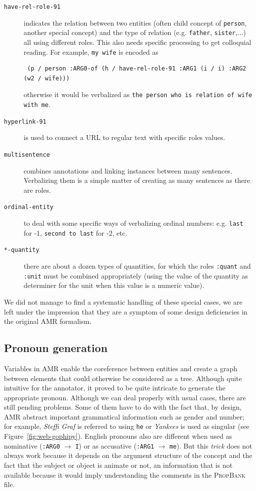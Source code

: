 \documentclass[12pt]{article}
\newcommand{\systeme}[1]{\textsc{#1}}
\newcommand{\propbank}{\systeme{PropBank}}
\newcommand{\representation}[1]{\textsf{#1}}
\newcommand{\AMR}{\representation{AMR}}
\begin{document}
\begin{description}
 \item[\texttt{have-rel-role-91}] indicates the relation between two entities (often child concept of \texttt{person}, another special concept) and the type of relation (e.g. \texttt{father}, \texttt{sister},...) all using different roles.  This also needs specific processing to get colloquial reading. For example, \lstinline{my wife} is encoded as
 \begin{lstlisting}
 (p / person :ARG0-of (h / have-rel-role-91 :ARG1 (i / i) :ARG2 (w2 / wife)))
 \end{lstlisting}
 otherwise it would be verbalized as \texttt{the person who is relation of wife with me}.
 \item[\texttt{hyperlink-91}] is used to connect a URL to regular text with specific roles values.
 \item[\texttt{multisentence}] combines annotations and linking instances between many sentences. Verbalizing them is a simple matter of creating as many sentences as there are roles.
 \item[\texttt{ordinal-entity}] to deal with some specific ways of verbalizing ordinal numbers: e.g. \texttt{last} for -1, \texttt{second to last} for -2, etc.
 \item[\texttt{*-quantity}] there are about a dozen types of quantities, for which the roles \texttt{:quant} and \texttt{:unit} must be combined appropriately (using the value of the quantity as determiner for the unit when this value is a numeric value).
\end{description}

We did not manage to find a systematic handling of these special cases, we are left under the impression that they are a symptom of some design deficiencies in the original \AMR{} formalism.

\subsection{Pronoun generation} %
\label{ssub:pronoun_generation}
Variables in \AMR{} enable the coreference between entities and create a graph between elements that could otherwise be considered as a tree. Although quite intuitive for the annotator, it proved to be quite intricate to generate the appropriate pronoun. Although we can deal properly with usual cases, there are still pending problems. Some of them have to do with the fact that, by design, \AMR{} abstract important grammatical information such as gender and number; for example, \emph{Steffi Graf} is referred to using \texttt{he} or \emph{Yankees} is used as singular (see Figure~\ref{fig:web-gophipy}). English pronouns also are different when used as nominative (\texttt{:ARG0} $\rightarrow{}$ \texttt{I})  or as accusative (\texttt{:ARG1}  $\rightarrow{}$ \texttt{me}). But this \emph{trick} does not always work because it depends on the argument structure of the concept and the fact that the subject or object is animate or not, an information that is not available because it would imply understanding the comments in the \propbank{} file.
\end{document}
